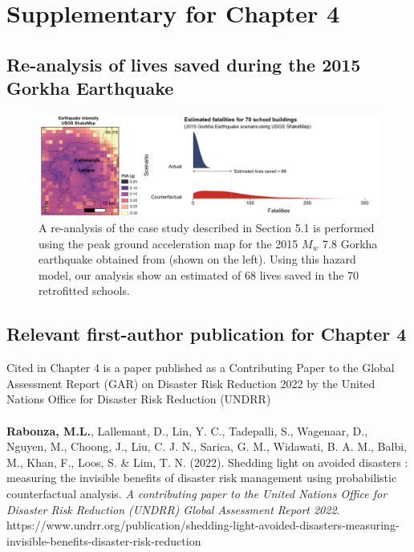 
\setcounter{chapter}{2}

\chapter{Supplementary for Chapter 4} \label{app-pls}


\section{Re-analysis of lives saved during the 2015 Gorkha Earthquake} \label{app-pls-1}
    \begin{figure}[htbp!]
    \begin{center} 
     \includegraphics[width=\linewidth]{Figures/results_case-shakemap-compile.png}
		\caption{A re-analysis of the case study described in Section 5.1 is performed using the peak ground acceleration map for the 2015 $M_{w}$ 7.8 Gorkha earthquake obtained from \cite{shakemap2015nepal} (shown on the left). Using this hazard model, our analysis show an estimated of 68 lives saved in the 70 retrofitted schools.}
	\label{fig:supplementary_ShakeMap}
	\end{center}
    \end{figure}


\section{Relevant first-author publication for Chapter 4} \label{app-pls-2}

\noindent
Cited in Chapter 4 is a paper published as a Contributing Paper to the Global Assessment Report (GAR) on Disaster Risk Reduction 2022 by the United Nations Office for Disaster Risk Reduction (UNDRR)
\\ \\
\noindent
\textbf{Rabonza, M.L.}, Lallemant,  D.,  Lin,  Y. C., Tadepalli,  S., Wagenaar,  D., Nguyen,  M., Choong,  J., Liu,  C. J. N., Sarica,  G. M., Widawati,  B. A. M., Balbi,  M., Khan,  F., Loos,  S. \& Lim,  T. N. (2022). Shedding light on avoided disasters : measuring the invisible benefits of disaster risk management using probabilistic counterfactual analysis. \textit{A contributing paper to the United Nations Office for Disaster Risk Reduction (UNDRR) Global Assessment Report 2022}. https://www.undrr.org/publication/shedding-light-avoided-disasters-measuring-invisible-benefits-disaster-risk-reduction

